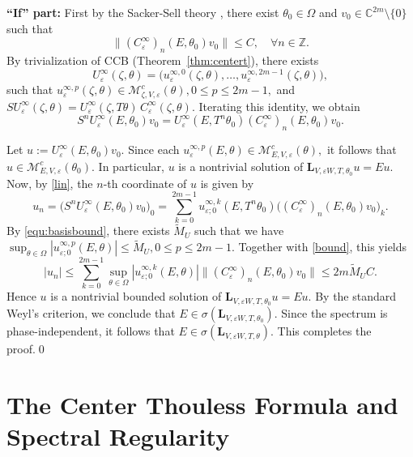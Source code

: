 \documentclass[reqno,11pt]{amsart}
\newcommand{\Z}{{\mathbb Z}}
\newcommand{\C}{{\mathbb C}}
\begin{document}
\medskip

\noindent
\textbf{``If'' part:}
First by the Sacker-Sell theory \cite{SS1,SS}, there exist $\theta_0\in\Omega$ and
$v_0\in\C^{2m}\setminus\{0\}$ such that
\begin{equation}\label{bound}
    \|(C^\infty_\varepsilon)_n(E,\theta_0)v_0\|\leq C,\quad 
 \forall n\in\Z.
\end{equation}
By trivialization of CCB (Theorem~\ref{thm:centert}), there exists
$$
U^\infty_\varepsilon(\zeta,\theta)
=\bigl(
u^{\infty,0}_\varepsilon(\zeta,\theta),\dots,
u^{\infty,2m-1}_\varepsilon(\zeta,\theta)
\bigr),
$$
such that
$
u^{\infty,p}_\varepsilon(\zeta,\theta)\in \mathcal M^c_{\zeta,V,\varepsilon}(\theta),
0\le p\le 2m-1,
$
and
$
SU^\infty_\varepsilon(\zeta,\theta)
=U^\infty_\varepsilon(\zeta,T\theta)\,
C^\infty_\varepsilon(\zeta,\theta).
$
Iterating this identity, we obtain
\begin{equation}\label{lin}
S^nU^\infty_\varepsilon(E,\theta_0)v_0
=U^\infty_\varepsilon(E,T^n\theta_0)
(C^\infty_\varepsilon)_n(E,\theta_0)v_0.
\end{equation}

Let
$
u:=U^\infty_\varepsilon(E,\theta_0)v_0.
$
Since each
$
u^{\infty,p}_\varepsilon(E,\theta)\in \mathcal M^c_{E,V,\varepsilon}(\theta),
$
it follows that
$
u\in \mathcal M^c_{E,V,\varepsilon}(\theta_0).
$
In particular, $u$ is a nontrivial solution of
$
\mathbf{L}_{V,\varepsilon W,T,\theta_0}u=Eu.
$
Now, by \eqref{lin}, the $n$-th coordinate of $u$ is given by
$$
u_n=\bigl(S^nU^\infty_\varepsilon(E,\theta_0)v_0\bigr)_0 =
\sum_{k=0}^{2m-1}u^{\infty,k}_{\varepsilon;0}(E,T^n\theta_0)
\bigl((C^\infty_\varepsilon)_n(E,\theta_0)v_0\bigr)_k.
$$
By \eqref{equ:basisbound}, there exists $\widetilde M_U$ such that 
we have
$
\sup_{\theta\in\Omega}|u^{\infty,p}_{\varepsilon;0}(E,\theta)|\leq\widetilde M_U,
 0\le p\le 2m-1.
$
Together with \eqref{bound}, this yields
$$
|u_n|\leq\sum_{k=0}^{2m-1}
\sup_{\theta\in\Omega}|u^{\infty,k}_{\varepsilon;0}(E,\theta)|
\|(C^\infty_\varepsilon)_n(E,\theta_0)v_0\|
\leq 2m\widetilde M_U C.
$$
Hence $u$ is a nontrivial bounded solution of
$
\mathbf{L}_{V,\varepsilon W,T,\theta_0}u=Eu.
$
By the standard Weyl's criterion, we conclude that
$
E\in \sigma(\mathbf{L}_{V,\varepsilon W,T,\theta_0}).
$
Since the spectrum is phase-independent, it follows that
$
E\in \sigma(\mathbf{L}_{V,\varepsilon W,T,\theta}).
$
This completes the proof.\qed



   

\section{The Center Thouless Formula and Spectral Regularity}
\end{document}
